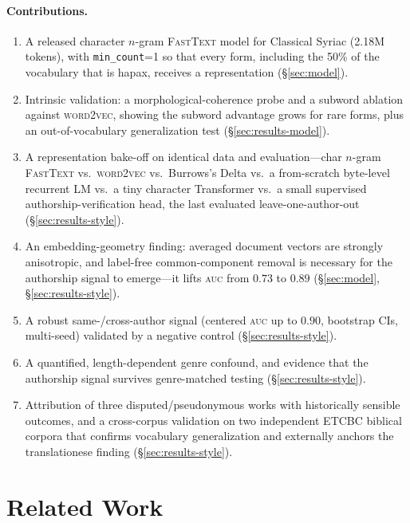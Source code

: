 \documentclass[11pt]{article}
\newcommand{\auc}{\textsc{auc}}
\newcommand{\auc}{\textsc{auc}}
\begin{document}
\paragraph{Contributions.}
\begin{enumerate}
  \item A released character $n$-gram \textsc{FastText} model for Classical
  Syriac (2.18M tokens), with \texttt{min\_count}=1 so that every form, including
  the 50\% of the vocabulary that is hapax, receives a representation
  (\S\ref{sec:model}).
  \item Intrinsic validation: a morphological-coherence probe and a subword
  ablation against \textsc{word2vec}, showing the subword advantage grows for
  rare forms, plus an out-of-vocabulary generalization test
  (\S\ref{sec:results-model}).
  \item A representation bake-off on identical data and evaluation---char
  $n$-gram \textsc{FastText} vs.\ \textsc{word2vec} vs.\ Burrows's Delta vs.\ a
  from-scratch byte-level recurrent LM vs.\ a tiny character Transformer vs.\ a
  small supervised authorship-verification head, the last evaluated
  leave-one-author-out (\S\ref{sec:results-style}).
  \item An embedding-geometry finding: averaged document vectors are strongly
  anisotropic, and label-free common-component removal is necessary for the
  authorship signal to emerge---it lifts \auc{} from $0.73$ to $0.89$
  (\S\ref{sec:model}, \S\ref{sec:results-style}).
  \item A robust same-/cross-author signal (centered \auc{} up to $0.90$,
  bootstrap CIs, multi-seed) validated by a negative control
  (\S\ref{sec:results-style}).
  \item A quantified, length-dependent genre confound, and evidence that the
  authorship signal survives genre-matched testing
  (\S\ref{sec:results-style}).
  \item Attribution of three disputed/pseudonymous works with historically
  sensible outcomes, and a cross-corpus validation on two independent ETCBC
  biblical corpora that confirms vocabulary generalization and externally anchors
  the translationese finding (\S\ref{sec:results-style}).
\end{enumerate}

\section{Related Work}
\label{sec:related}
\end{document}
